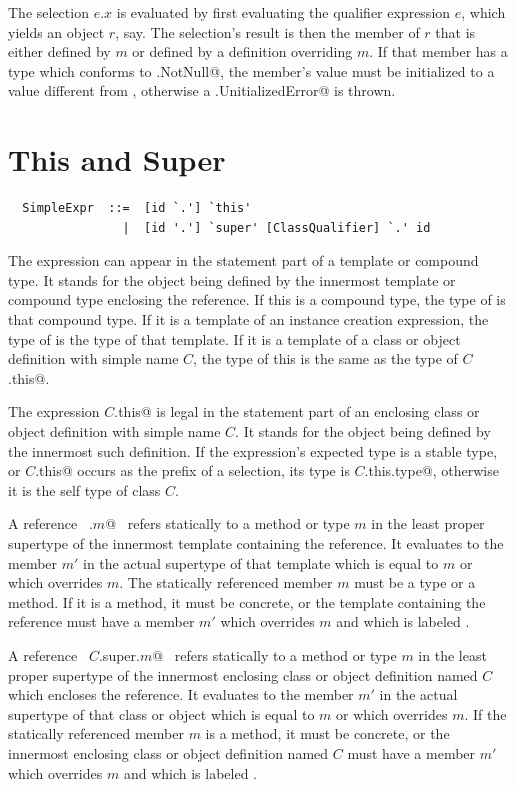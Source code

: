 The selection $e.x$ is evaluated by first evaluating the qualifier
expression $e$, which yields an object $r$, say. The selection's
result is then the member of $r$ that is either defined by $m$ or defined
by a definition overriding $m$. 
If that member has a type which
conforms to \lstinline@scala.NotNull@, the member's value must be initialized
to a value different from \lstinline@null@, otherwise a \lstinline@scala.UnitializedError@
is thrown.
 

\section{This and Super}
\label{sec:this-super}

\syntax\begin{lstlisting}
  SimpleExpr  ::=  [id `.'] `this'
                |  [id '.'] `super' [ClassQualifier] `.' id
\end{lstlisting}

The expression  can appear in the statement part of a
template or compound type. It stands for the object being defined by
the innermost template or compound type enclosing the reference. If
this is a compound type, the type of  is that compound type.
If it is a template of an instance creation expression, the type of
 is the type of that template. If it is a template of a
class or object definition with simple name $C$, the type of this
is the same as the type of \lstinline@$C$.this@.

The expression \lstinline@$C$.this@ is legal in the statement part of an
enclosing class or object definition with simple name $C$. It
stands for the object being defined by the innermost such definition.
If the expression's expected type is a stable type, or
\lstinline@$C$.this@ occurs as the prefix of a selection, its type is
\lstinline@$C$.this.type@, otherwise it is the self type of class $C$.

A reference ~\lstinline@super.$m$@~ refers statically to a method or type $m$
in the least proper supertype of the innermost template containing the
reference.  It evaluates to the member $m'$ in the actual supertype of
that template which is equal to $m$ or which overrides $m$.  The
statically referenced member $m$ must be a type or a method. If it is
a method, it must be concrete, or the template
containing the reference must have a member $m'$ which overrides $m$
and which is labeled .  

A reference ~\lstinline@$C$.super.$m$@~ refers statically to a method
or type $m$ in the least proper supertype of the innermost enclosing class or
object definition named $C$ which encloses the reference. It evaluates
to the member $m'$ in the actual supertype of that class or object
which is equal to $m$ or which overrides $m$.  If the statically
referenced member $m$ is a method, it must be concrete, or the innermost enclosing
class or object definition named $C$ must have a member $m'$ which
overrides $m$ and which is labeled .

